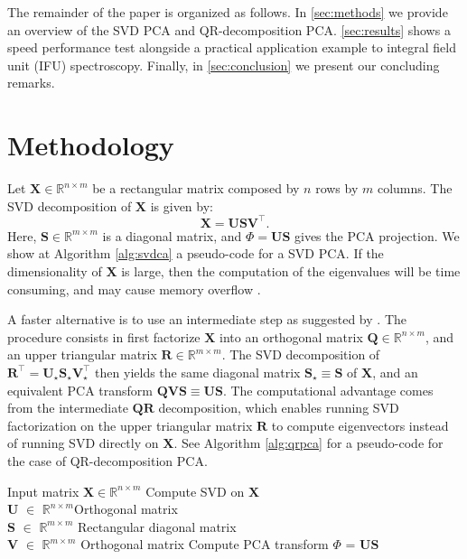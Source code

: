 \documentclass[preprint,authoryear,11pt,5p,times]{elsarticle}
\begin{document}
The remainder of the paper is organized as follows. In \autoref{sec:methods} we provide an overview of the SVD PCA and  QR-decomposition PCA. \autoref{sec:results} shows a speed performance test alongside a practical application example to integral field unit (IFU) spectroscopy. Finally, in \autoref{sec:conclusion} we present our concluding remarks.

\section{Methodology}
\label{sec:methods}


Let $\mathbf{X} \in \mathbb{R}^{n\times m}$ be a rectangular matrix composed by  $n$ rows by  $m$ columns. The SVD decomposition of  $\mathbf{X}$ is given by:
\begin{equation}
\mathbf{X} =  \mathbf{U}\mathbf{S}\mathbf{V}^{\intercal}. 
\end{equation}
Here, $\mathbf{S} \in \mathbb{R}^{m\times m}$ is a diagonal matrix, and  $\Phi =  \mathbf{U}\mathbf{S}$ gives the PCA projection.   We show at Algorithm  \ref{alg:svdca} a pseudo-code for a SVD PCA.  If the dimensionality of $\mathbf{X}$  is large, then the computation of the eigenvalues will be time consuming, and may cause memory overflow \citep[e.g.][]{ADNAN2021101710}.

A faster alternative is to use an intermediate step as suggested by \citet{RN1}. The procedure consists in first factorize $\mathbf{X}$ into an  orthogonal matrix $\mathbf{Q} \in \mathbb{R}^{n\times m}$, and an upper triangular matrix $\mathbf{R} \in \mathbb{R}^{m\times m}$. The SVD decomposition of  $\mathbf{R}^{\intercal} = \mathbf{U}_{\star}\mathbf{S}_{\star}\mathbf{V}^{\intercal}_{\star}$ then yields the same diagonal matrix $\mathbf{S}_{\star} \equiv  \mathbf{S} $ of $\mathbf{X}$, and an equivalent PCA transform $\mathbf{Q}\mathbf{V}\mathbf{S} \equiv \mathbf{U}\mathbf{S}$. 
The computational advantage comes from the intermediate  $\mathbf{Q}\mathbf{R}$ decomposition, which enables running SVD factorization on the upper triangular matrix $\mathbf{R}$ to compute eigenvectors instead of running SVD directly on $\mathbf{X}$. See Algorithm  \ref{alg:qrpca} for a  pseudo-code for the case of  QR-decomposition PCA.


\begin{algorithm}[ht]

    \caption{SVD PCA}\label{alg:svdca}
    \hspace*{\algorithmicindent} 
    \begin{algorithmic}[1]
        \Require Input matrix $\mathbf{X} \in \mathbb{R}^{n\times m}$
    \State Compute SVD on $\mathbf{X}$\\
    $\mathbf{U}$ $\in$ $\mathbb{R}^{n\times m}$\quad Orthogonal matrix  \\
       $\mathbf{S}$ $\in$ $\mathbb{R}^{m\times m}$ \quad Rectangular diagonal matrix  \\
        $\mathbf{V}$ $\in$ $\mathbb{R}^{m\times m}$ \quad Orthogonal matrix
    \State Compute PCA transform $\Phi$ = $\mathbf{U}\mathbf{S}$ 
    \end{algorithmic}
\end{algorithm}
\end{document}
